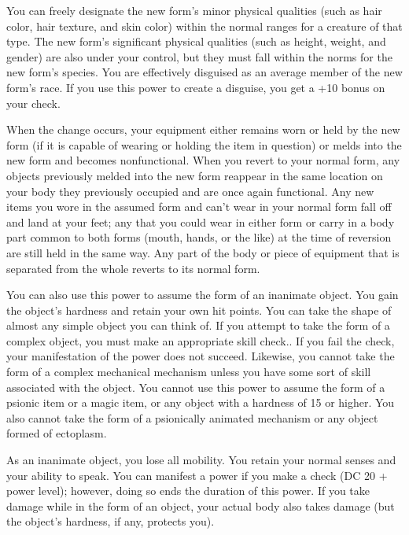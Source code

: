 {	You can freely designate the new form's minor physical qualities (such as hair color, hair texture, and skin color) within the normal ranges for a creature of that type. The new form's significant physical qualities (such as height, weight, and gender) are also under your control, but they must fall within the norms for the new form's species. You are effectively disguised as an average member of the new form's race. If you use this power to create a disguise, you get a +10 bonus on your  check.

	When the change occurs, your equipment either remains worn or held by the new form (if it is capable of wearing or holding the item in question) or melds into the new form and becomes nonfunctional. When you revert to your normal form, any objects previously melded into the new form reappear in the same location on your body they previously occupied and are once again functional. Any new items you wore in the assumed form and can't wear in your normal form fall off and land at your feet; any that you could wear in either form or carry in a body part common to both forms (mouth, hands, or the like) at the time of reversion are still held in the same way. Any part of the body or piece of equipment that is separated from the whole reverts to its normal form.

	You can also use this power to assume the form of an inanimate object. You gain the object's hardness and retain your own hit points. You can take the shape of almost any simple object you can think of. If you attempt to take the form of a complex object, you must make an appropriate skill check.. If you fail the check, your manifestation of the power does not succeed. Likewise, you cannot take the form of a complex mechanical mechanism unless you have some sort of skill associated with the object. You cannot use this power to assume the form of a psionic item or a magic item, or any object with a hardness of 15 or higher. You also cannot take the form of a psionically animated mechanism or any object formed of ectoplasm.

	As an inanimate object, you lose all mobility. You retain your normal senses and your ability to speak. You can manifest a power if you make a  check (DC 20 + power level); however, doing so ends the duration of this power. If you take damage while in the form of an object, your actual body also takes damage (but the object's hardness, if any, protects you).
}